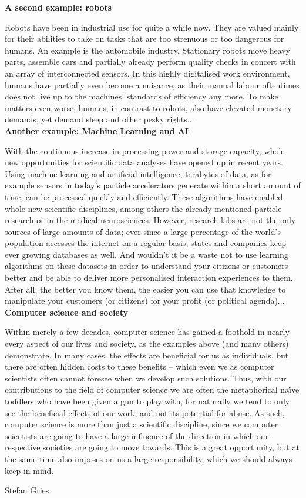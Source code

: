 {\textbf{A second example: robots}

Robots have been in industrial use for quite a while now. They are valued mainly for their abilities to take on tasks that are too strenuous or too dangerous for humans.
An example is the automobile industry. Stationary robots move heavy parts, assemble cars and partially already perform quality checks in concert with an array of interconnected sensors.
In this highly digitalised work environment, humans have partially even become a nuisance, as their manual labour oftentimes does not live up to the machines' standards of efficiency any more.
To make matters even worse, humans, in contrast to robots, also have elevated monetary demands, yet demand sleep and other pesky rights...\\

\textbf{Another example: Machine Learning and AI}

With the continuous increase in processing power and storage capacity, whole new opportunities for scientific data analyses have opened up in recent years.
Using machine learning and artificial intelligence, terabytes of data, as for example sensors in today's particle accelerators generate within a short amount of time, can be processed quickly and efficiently.
These algorithms have enabled whole new scientific disciplines, among others the already mentioned particle research or in the medical neurosciences.
However, research labs are not the only sources of large amounts of data; ever since a large percentage of the world's population accesses the internet on a regular basis, states and companies keep ever growing databases as well.
And wouldn't it be a waste not to use learning algorithms on these datasets in order to understand your citizens or customers better and be able to deliver more personalised interaction experiences to them.
After all, the better you know them, the easier you can use that knowledge to manipulate your customers (or citizens) for your profit (or political agenda)...\\

\textbf{Computer science and society}

Within merely a few decades, computer science has gained a foothold in nearly every aspect of our lives and society, as the examples above (and many others) demonstrate.
In many cases, the effects are beneficial for us as individuals, but there are often hidden costs to these benefits -- which even we as computer scientists often cannot foresee when we develop such solutions.
Thus, with our contributions to the field of computer science we are often the metaphorical na\"ive toddlers who have been given a gun to play with, for naturally we tend to only see the beneficial effects of our work, and not its potential for abuse.
As such, computer science is more than just a scientific discipline, since we computer scientists are going to have a large influence of the direction in which our respective societies are going to move towards.
This is a great opportunity, but at the same time also imposes on us a large responsibility, which we should always keep in mind.
}
{Stefan Gries}
\newpage
